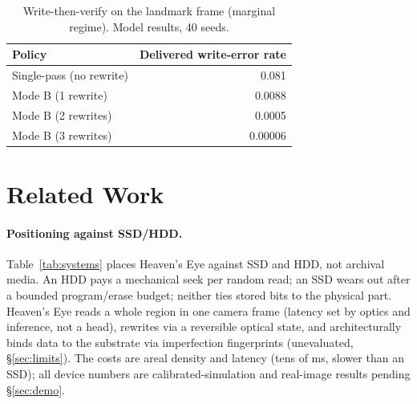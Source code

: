 \documentclass[letterpaper,twocolumn,10pt]{article}
\begin{document}
\begin{table}[t]\centering\small
\setlength{\tabcolsep}{6pt}
\caption{Write-then-verify on the landmark frame (marginal regime). Model results,
40 seeds.}
\label{tab:rw}
\begin{tabular}{lr}
\toprule
Policy & Delivered write-error rate \\
\midrule
Single-pass (no rewrite) & 0.081 \\
Mode B (1 rewrite) & 0.0088 \\
Mode B (2 rewrites) & 0.0005 \\
Mode B (3 rewrites) & 0.00006 \\
\bottomrule
\end{tabular}
\end{table}

\section{Related Work}
\label{sec:related}

\paragraph{Positioning against SSD/HDD.}
Table~\ref{tab:systems} places Heaven's Eye against SSD and HDD, not archival media. An
HDD pays a mechanical seek per random read; an SSD wears out after a bounded
program/erase budget; neither ties stored bits to the physical part. Heaven's Eye reads a
whole region in one camera frame (latency set by optics and inference, not a head),
rewrites via a reversible optical state, and architecturally binds data to the substrate
via imperfection fingerprints (unevaluated, \S\ref{sec:limits}). The costs are areal
density and latency (tens of ms, slower than an SSD); all device numbers are
calibrated-simulation and real-image results pending \S\ref{sec:demo}.
\end{document}
